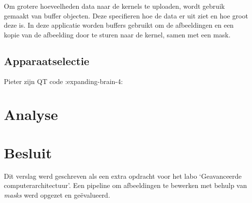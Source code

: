 \documentclass[twocolumn, a4paper]{article}
\begin{document}
Om grotere hoeveelheden data naar de kernels te uploaden, wordt gebruik gemaakt van buffer objecten. Deze specifieren hoe de data er uit ziet en hoe groot deze is. In deze applicatie worden buffers gebruikt om de afbeeldingen en een kopie van de afbeelding door te sturen naar de kernel, samen met een mask.

\subsection{Apparaatselectie}
Pieter zijn QT code :expanding-brain-4:

\section{Analyse}

\section{Besluit}
Dit verslag werd geschreven als een extra opdracht voor het labo `Geavanceerde computerarchitectuur'. Een pipeline om afbeeldingen te bewerken met behulp van \textit{masks} werd opgezet en ge\"evalueerd.

\onecolumn

\appendix




\newpage

\end{document}
